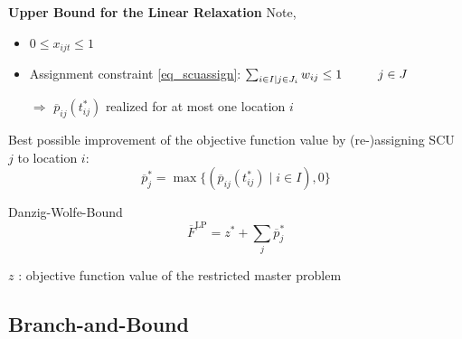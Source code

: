 \begin{frame}{\textbf{Upper Bound for the Linear Relaxation}} 
Note,
\begin{itemize}
	\item $0\le x_{ijt} \le 1$
	\item Assignment constraint \eqref{eq_scuassign}: $\sum_{i \in I\mid j \in J_i} w_{ij}   \le 1 \hspace*{1cm} j \in J $
	\item[$\Rightarrow$] $\overline{p}_{ij}(t_{ij}^*)$ realized for at most one location $i$
\end{itemize}
\vfill

Best possible improvement of the objective function value by (re-)assigning SCU $j$ to location $i$:
\[
	\overline{p}_j^* = \max \{\left(\overline{p}_{ij}(t_{ij}^*)\mid i \in I\right),0\}
\]


\begin{block}{Danzig-Wolfe-Bound}
\[ \overline{F}^{\text{LP}} = z^* +\sum_{j} \overline{p}_j^*\]
\end{block}
$z$ : objective function value of the restricted master problem\\

\end{frame}

\subsection{Branch-and-Bound}

